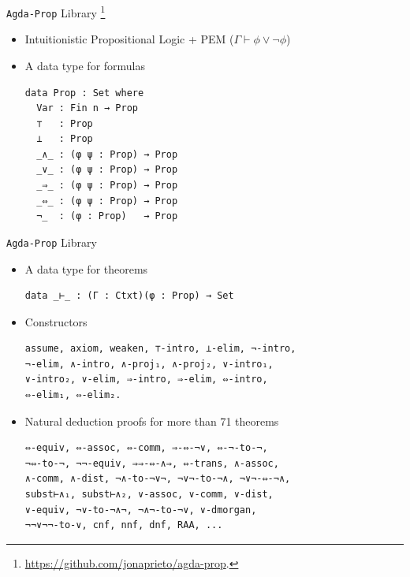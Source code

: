 \documentclass[10pt, xetex, hyperref={pdfpagelabels=false}]{beamer}
\begin{document}
\begin{frame}[fragile, label=agda-prop-2]{\texttt{Agda-Prop} Library
  \footnote{\url{https://github.com/jonaprieto/agda-prop}.}}
\begin{itemize}
  \item Intuitionistic Propositional Logic + PEM ($Γ ⊢ ϕ ∨ ¬ ϕ$)
  \item A data type for formulas
  \vspace*{1mm}

\begin{verbatim}
data Prop : Set where
  Var : Fin n → Prop
  ⊤   : Prop
  ⊥   : Prop
  _∧_ : (φ ψ : Prop) → Prop
  _∨_ : (φ ψ : Prop) → Prop
  _⇒_ : (φ ψ : Prop) → Prop
  _⇔_ : (φ ψ : Prop) → Prop
  ¬_  : (φ : Prop)   → Prop
\end{verbatim}
\end{itemize}
\end{frame}

\begin{frame}[fragile, label=agda-prop]{\texttt{Agda-Prop} Library~\citep{AgdaProp}}
\begin{itemize}
  \item A data type for theorems
  \vspace*{1mm}
\begin{verbatim}
data _⊢_ : (Γ : Ctxt)(φ : Prop) → Set
\end{verbatim}

\item Constructors
  \vspace*{1mm}

\begin{verbatim}
assume, axiom, weaken, ⊤-intro, ⊥-elim, ¬-intro,
¬-elim, ∧-intro, ∧-proj₁, ∧-proj₂, ∨-intro₁,
∨-intro₂, ∨-elim, ⇒-intro, ⇒-elim, ⇔-intro,
⇔-elim₁, ⇔-elim₂.
\end{verbatim}
  \item Natural deduction proofs for more than 71 theorems
  \vspace*{1mm}
\begin{verbatim}
⇔-equiv, ⇔-assoc, ⇔-comm, ⇒-⇔-¬∨, ⇔-¬-to-¬,
¬⇔-to-¬, ¬¬-equiv, ⇒⇒-⇔-∧⇒, ⇔-trans, ∧-assoc,
∧-comm, ∧-dist, ¬∧-to-¬∨¬, ¬∨¬-to-¬∧, ¬∨¬-⇔-¬∧,
subst⊢∧₁, subst⊢∧₂, ∨-assoc, ∨-comm, ∨-dist,
∨-equiv, ¬∨-to-¬∧¬, ¬∧¬-to-¬∨, ∨-dmorgan,
¬¬∨¬¬-to-∨, cnf, nnf, dnf, RAA, ...
\end{verbatim}
\end{itemize}
\end{frame}
\end{document}

